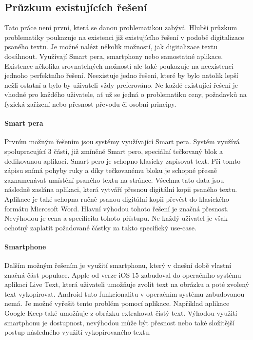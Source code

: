 \documentclass[journal]{IEEEtran}
\begin{document}
\subsection{Průzkum existujících řešení}
Tato práce není první, která se danou problematikou zabývá.
Hlubší průzkum problematiky poukazuje na existenci již existujícího řešení v podobě digitalizace psaného textu.
Je možné nalézt několik možností, jak digitalizace textu dosáhnout.
Využívají Smart pera, smartphony nebo samostatné aplikace.
Existence několika srovnatelných možností ale také poukazuje na neexistenci jednoho perfektního řešení.
Neexistuje jedno řešení, které by bylo natolik lepší nežli ostatní a bylo by uživateli vždy preferováno.
Ne každé existující řešení je vhodné pro každého uživatele, ať už se jedná o problematiku ceny, požadavků na fyzická zařízení nebo přesnost převodu či osobní principy.\cite{aarp_digitalization, popupalr_science_digitalization_with_pens}

\paragraph{Smart pera}
Prvním možným řešením jsou systémy využívající Smart pera.
Systém využívá spolupracující 3 části, již zmíněné Smart pero, speciální tečkovaný blok a dedikovanou aplikaci.
Smart pero je schopno klasicky zapisovat text.
Při tomto zápisu snímá pohyby ruky a díky tečkovanému bloku je schopné přesně zaznamenávat umístění psaného textu na stránce.
Všechna tato data jsou následně zaslána aplikaci, která vytváří přesnou digitální kopii psaného textu.
Aplikace je také schopna ručně psanou digitální kopii převést do klasického formátu Microsoft Word.
Hlavní výhodou tohoto řešení je značná přesnost.
Nevýhodou je cena a specificita tohoto přístupu.
Ne každý uživatel je však ochotný zaplatit požadované částky za takto specifický use-case.\cite{popupalr_science_digitalization_with_pens}

\paragraph{Smartphone}
Dalším možným řešením je využití smartphonu, který v dnešní době vlastní značná část populace.
Apple od verze iOS 15 zabudoval do operačního systému aplikaci Live Text, která uživateli umožňuje zvolit text na obrázku a poté zvolený text vykopírovat.
Android tuto funkcionalitu v operačním systému zabudovanou nemá.
Je možné vyřešit tento problém pomocí aplikace.
Například aplikace Google Keep také umožňuje z obrázku extrahovat čistý text.\cite{aarp_digitalization, google_keep}
Výhodou využití smartphonu je dostupnost, nevýhodou může být přesnost nebo také složitější postup následného využití vykopírovaného textu.
\end{document}
